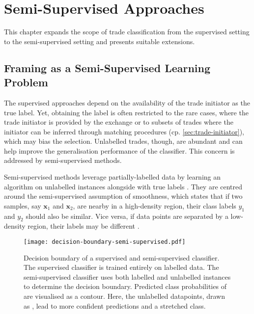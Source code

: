 \section{Semi-Supervised Approaches}\label{sec:semi-supervised-approaches}

This chapter expands the scope of trade classification from the supervised setting to the semi-supervised setting and presents suitable extensions.

\subsection{Framing as a Semi-Supervised Learning Problem}\label{sec:problem-framing-2}

The supervised approaches depend on the availability of the trade initiator as the true label. Yet, obtaining the label is often restricted to the rare cases, where the trade initiator is provided by the exchange or to subsets of trades where the initiator can be inferred through matching procedures (cp. \cref{sec:trade-initiator}), which may bias the selection. Unlabelled trades, though, are abundant and can help improve the generalisation performance of the classifier. This concern is addressed by semi-supervised methods.

Semi-supervised methods leverage partially-labelled data by learning an algorithm on unlabelled instances alongside with true labels \autocite[][6]{chapelleSemisupervisedLearning2006}. They are centred around the semi-supervised assumption of smoothness, which states that if two samples, say $\mathbf{x}_{1}$ and $\mathbf{x}_{2}$, are nearby in a high-density region, their class labels $y_{1}$ and $y_{2}$ should also be similar. Vice versa, if data points are separated by a low-density region, their labels may be different \autocite[][5]{chapelleSemisupervisedLearning2006}.

\begin{figure}[ht]
    \centering
    \texttt{[image: decision-boundary-semi-supervised.pdf]}
    \caption[Decision Boundary of a Supervised and Semi-Supervised Classifier]{Decision boundary of a supervised and semi-supervised classifier. The supervised classifier is trained entirely on labelled data. The semi-supervised classifier uses both labelled and unlabelled instances to determine the decision boundary. Predicted class probabilities of  are visualised as a contour. Here, the unlabelled datapoints, drawn as , lead to more confident predictions and a stretched class.}
    \label{fig:supervised-semi-supervised}
\end{figure}

